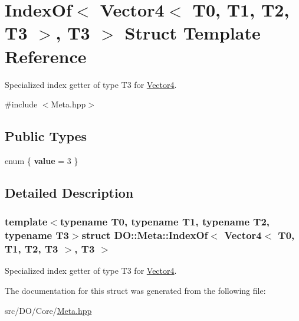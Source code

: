 \hypertarget{struct_d_o_1_1_meta_1_1_index_of_3_01_vector4_3_01_t0_00_01_t1_00_01_t2_00_01_t3_01_4_00_01_t3_01_4}{\section{Index\-Of$<$ Vector4$<$ T0, T1, T2, T3 $>$, T3 $>$ Struct Template Reference}
\label{struct_d_o_1_1_meta_1_1_index_of_3_01_vector4_3_01_t0_00_01_t1_00_01_t2_00_01_t3_01_4_00_01_t3_01_4}
}


Specialized index getter of type T3 for \hyperlink{struct_d_o_1_1_meta_1_1_vector4}{Vector4}.  




{\ttfamily \#include $<$Meta.\-hpp$>$}

\subsection*{Public Types}
\begin{DoxyCompactItemize}
\item 
enum \{ {\bfseries value} = 3
 \}
\end{DoxyCompactItemize}


\subsection{Detailed Description}
\subsubsection*{template$<$typename T0, typename T1, typename T2, typename T3$>$struct D\-O\-::\-Meta\-::\-Index\-Of$<$ Vector4$<$ T0, T1, T2, T3 $>$, T3 $>$}

Specialized index getter of type T3 for \hyperlink{struct_d_o_1_1_meta_1_1_vector4}{Vector4}. 

The documentation for this struct was generated from the following file\-:\begin{DoxyCompactItemize}
\item 
src/\-D\-O/\-Core/\hyperlink{_meta_8hpp}{Meta.\-hpp}\end{DoxyCompactItemize}
